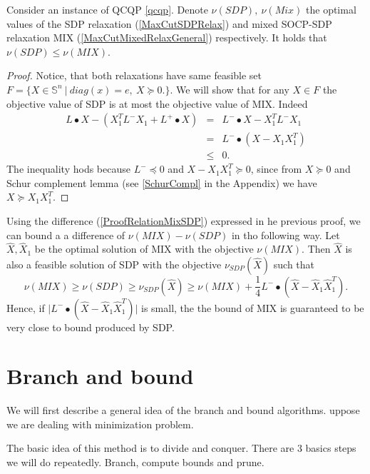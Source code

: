 \documentclass[12pt]{book}
\theoremstyle{definition}
\begin{document}
\thm Consider an instance of QCQP \ref{qcqp}. Denote $\nu(SDP), \ \nu(Mix)$ the optimal values of the SDP relaxation (\ref{MaxCutSDPRelax}) and mixed SOCP-SDP relaxation MIX (\ref{MaxCutMixedRelaxGeneral}) respectively. It holds that $\nu(SDP)\leq \nu(MIX)$.
\rm
\begin{proof}
Notice, that both relaxations have same feasible set $F = \{X\in \mathbb{S}^n \ \vert \ diag(x) = e,\ X\succeq 0.\}$. We will show that for any $X\in F$ the objective value of SDP is at most the objective value of MIX. Indeed
\begin{equation}
\label{ProofRelationMixSDP}
\begin{array}{rcl}
L\bullet X - ( X_1^TL^-X_1 + L^+\bullet X) 
& = & L^-\bullet X - X_1^TL^-X_1 \\ 
&=&  L^-\bullet (X - X_1 X_1^T) \\ 
&\leq & 0.
\end{array}
\end{equation}
The inequality hods because $L^-\preceq 0$ and $X-X_1X_1^T\succeq 0$,
since from $X\succeq 0$ and Schur complement lemma (see \ref{SchurCompl} in the Appendix) we have $X\succeq X_1X_1^T.$ 
\end{proof}

\rem Using the difference (\ref{ProofRelationMixSDP}) expressed in he previous proof, we can bound a a difference of $\nu(MIX)-\nu(SDP)$ in tho following way. Let $\hat{X}, \hat{X}_1$ be the optimal solution of MIX with the objective $\nu(MIX)$. Then $\hat{X}$ is also a feasible solution of SDP with the objective $\nu_{SDP}(\hat{X})$ such that
$$\nu(MIX)\geq \nu(SDP) \geq \nu_{SDP}(\hat{X})\geq \nu(MIX) + \frac{1}{4}L^-\bullet (\hat{X} - \hat{X}_1 \hat{X}_1^T).$$
Hence, if $\vert L^-\bullet (\hat{X} - \hat{X}_1 \hat{X}_1^T)\vert$ is small, the the bound of MIX is guaranteed to be very close to bound produced by SDP. 






\section{Branch and bound}
\label{SectionBranchAndBound}



We will first describe a general idea of the branch and bound algorithms.  uppose we are dealing with minimization problem.

The basic idea of this method is to divide and conquer. There are 3 basics steps we will do repeatedly. Branch, compute bounds and prune.
\end{document}
